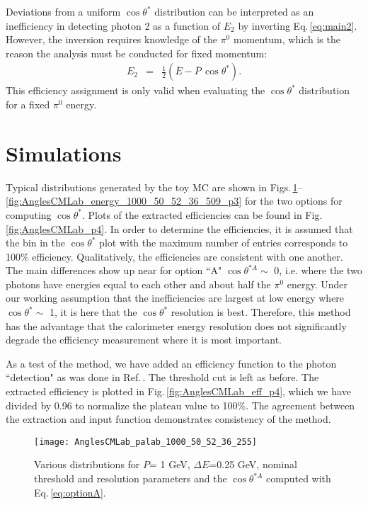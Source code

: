 \documentclass[12pt]{article}
\begin{document}
Deviations from a uniform $\cos{\theta^*}$ distribution can be interpreted as an inefficiency in detecting photon 2 as a function of $E_2$ by inverting Eq.\,\ref{eq:main2}.  However, the  inversion
requires knowledge of the $\pi^0$ momentum, which is the reason the analysis must be conducted for fixed momentum:
\begin{eqnarray}
E_2 & = & \frac{1}{2}(\overline{E} - \overline{P}\,\cos{\theta^*}).
\end{eqnarray}
This efficiency assignment is only valid when evaluating the $\cos{\theta^*}$ distribution for a fixed $\pi^0$ energy.

\section{Simulations}
Typical distributions generated by the toy MC are shown in Figs.\,\ref{fig:AnglesCMLab_palab_1000_50_52_36_255_p2}--\ref{fig:AnglesCMLab_energy_1000_50_52_36_509_p3} 
for the two options for computing $\cos{\theta^*}$. Plots of the extracted efficiencies can be found in Fig.\,\ref{fig:AnglesCMLab_p4}. In order to determine the efficiencies, it is assumed that
the bin in the $\cos{\theta^*}$ plot with the maximum number of entries corresponds to 100\% efficiency. 
Qualitatively, the efficiencies are consistent with one another. The main differences show up near for option ``A" $\cos{\theta^{*A}} \sim$ 0, i.e. where the two photons have energies equal to each other
and about half the $\pi^0$ energy.   Under our working assumption that the inefficiencies are largest at
low energy where $\cos{\theta^*} \sim$ 1, it is here that the $\cos{\theta^*}$ resolution is best. Therefore, this method has the advantage that the calorimeter energy resolution does not 
significantly degrade the efficiency measurement where it is most important.

As a test of the method, we have added an efficiency function to the photon ``detection"  as was done in Ref.\,\cite{hdnote3844}.  The threshold cut is left as before.
The extracted efficiency is plotted in  Fig.\,\ref{fig:AnglesCMLab_eff_p4}, which we have divided by 0.96 to normalize the plateau value to 100\%. The agreement between the extraction and 
input function demonstrates consistency of the method.



\begin{figure}[tbph]
\begin{center}
\texttt{[image: AnglesCMLab\_palab\_1000\_50\_52\_36\_255]}
\caption{Various distributions for $P$= 1 GeV, $\Delta E$=0.25 GeV, nominal threshold and resolution parameters and the $\cos{\theta^{*A}}$ computed with Eq.\,\ref{eq:optionA}.
\label{fig:AnglesCMLab_palab_1000_50_52_36_255_p2}}
\end{center}
\end{figure}
\end{document}
